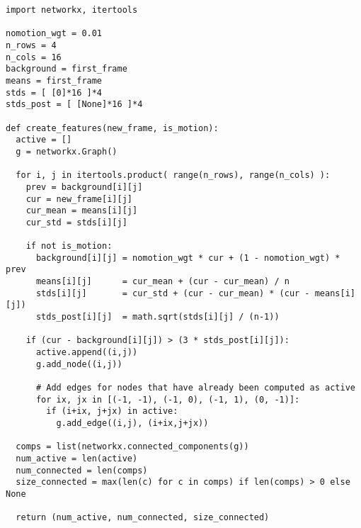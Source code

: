 \begin{verbatim}
import networkx, itertools

nomotion_wgt = 0.01
n_rows = 4
n_cols = 16
background = first_frame
means = first_frame
stds = [ [0]*16 ]*4
stds_post = [ [None]*16 ]*4

def create_features(new_frame, is_motion):
  active = []
  g = networkx.Graph()

  for i, j in itertools.product( range(n_rows), range(n_cols) ):
    prev = background[i][j]
    cur = new_frame[i][j]
    cur_mean = means[i][j]
    cur_std = stds[i][j]

    if not is_motion:
      background[i][j] = nomotion_wgt * cur + (1 - nomotion_wgt) * prev
      means[i][j]      = cur_mean + (cur - cur_mean) / n
      stds[i][j]       = cur_std + (cur - cur_mean) * (cur - means[i][j])
      stds_post[i][j]  = math.sqrt(stds[i][j] / (n-1))

    if (cur - background[i][j]) > (3 * stds_post[i][j]):
      active.append((i,j))
      g.add_node((i,j))

      # Add edges for nodes that have already been computed as active
      for ix, jx in [(-1, -1), (-1, 0), (-1, 1), (0, -1)]:
        if (i+ix, j+jx) in active:
          g.add_edge((i,j), (i+ix,j+jx))

  comps = list(networkx.connected_components(g))
  num_active = len(active)
  num_connected = len(comps)
  size_connected = max(len(c) for c in comps) if len(comps) > 0 else None

  return (num_active, num_connected, size_connected)
\end{verbatim}